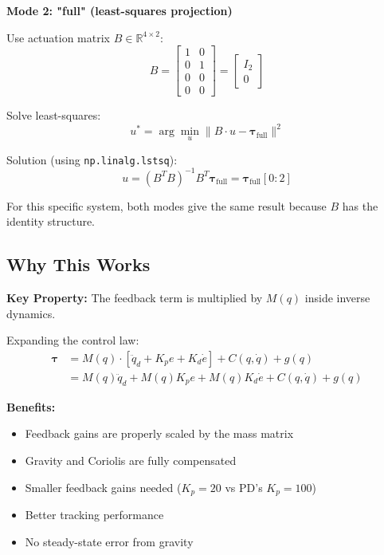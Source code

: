 \textbf{Mode 2: "full" (least-squares projection)}

Use actuation matrix $B \in \mathbb{R}^{4 \times 2}$:
\begin{equation}
B = \begin{bmatrix}
1 & 0 \\
0 & 1 \\
0 & 0 \\
0 & 0
\end{bmatrix}
= \begin{bmatrix}
I_{2} \\
0
\end{bmatrix}
\end{equation}

Solve least-squares:
\begin{equation}
u^* = \arg\min_u \|B \cdot u - \boldsymbol{\tau}_{\text{full}}\|^2
\tag{LS Projection}
\end{equation}

Solution (using \texttt{np.linalg.lstsq}):
\begin{equation}
u = (B^T B)^{-1} B^T \boldsymbol{\tau}_{\text{full}} = \boldsymbol{\tau}_{\text{full}}[0:2]
\end{equation}

For this specific system, both modes give the same result because $B$ has the identity structure.

\subsection*{Why This Works}

\textbf{Key Property:} The feedback term is multiplied by $M(q)$ inside inverse dynamics.

Expanding the control law:
\begin{align}
\boldsymbol{\tau} &= M(q) \cdot [\ddot{q}_d + K_p e + K_d \dot{e}] + C(q,\dot{q}) + g(q) \\
&= M(q)\ddot{q}_d + M(q)K_p e + M(q)K_d \dot{e} + C(q,\dot{q}) + g(q)
\end{align}

\textbf{Benefits:}
\begin{itemize}
\item Feedback gains are properly scaled by the mass matrix
\item Gravity and Coriolis are fully compensated
\item Smaller feedback gains needed ($K_p=20$ vs PD's $K_p=100$)
\item Better tracking performance
\item No steady-state error from gravity
\end{itemize}

